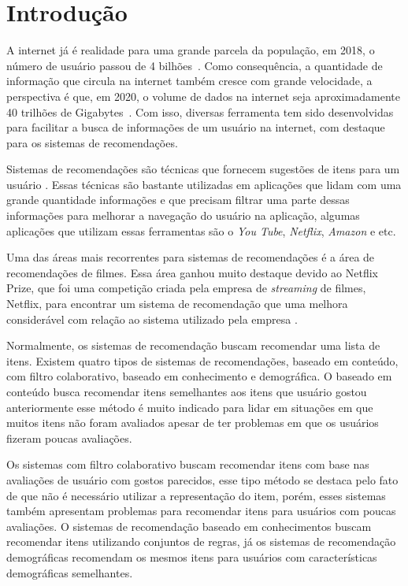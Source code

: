 \chapter{Introdução}
A internet já é realidade para uma grande parcela da população, em 2018, o número de usuário passou de 4 bilhões~\cite{internetusers}. Como consequência, a quantidade de informação que circula na internet também cresce com grande velocidade, a perspectiva é que, em 2020, o volume de dados na internet seja aproximadamente 40 trilhões de Gigabytes~\cite{volumedados}. Com isso, diversas ferramenta tem sido desenvolvidas para facilitar a busca de informações de um usuário na internet, com destaque para os sistemas de recomendações.

Sistemas de recomendações são técnicas que fornecem sugestões de itens para um usuário \cite{ricci2011introduction}. Essas técnicas são bastante utilizadas em aplicações que lidam com uma grande quantidade informações e que precisam filtrar uma parte dessas informações para melhorar a navegação do usuário na aplicação, algumas aplicações que utilizam essas ferramentas são o \textit{You Tube}, \textit{Netflix}, \textit{Amazon} e etc.

Uma das áreas mais recorrentes para sistemas de recomendações é a área de recomendações de filmes. Essa área ganhou muito destaque devido ao Netflix Prize, que foi uma competição criada pela empresa de \textit{streaming} de filmes, Netflix, para encontrar um sistema de recomendação que uma melhora considerável com relação ao sistema utilizado pela empresa \cite{netflixprize}.

Normalmente, os sistemas de recomendação buscam recomendar uma lista de itens. Existem quatro tipos de sistemas de recomendações, baseado em conteúdo, com filtro colaborativo, baseado em conhecimento e demográfica. O baseado em conteúdo busca recomendar itens semelhantes aos itens que usuário gostou anteriormente esse método é muito indicado para lidar em situações em que muitos itens não foram avaliados apesar de ter problemas em que os usuários fizeram poucas avaliações.

Os sistemas com filtro colaborativo buscam recomendar itens com base nas avaliações de usuário com gostos parecidos, esse tipo método se destaca pelo fato de que não é necessário utilizar a representação do item, porém, esses sistemas também apresentam problemas para recomendar itens para usuários com poucas avaliações. O sistemas de recomendação baseado em conhecimentos buscam recomendar itens utilizando conjuntos de regras, já os sistemas de recomendação demográficas recomendam os mesmos itens para usuários com características demográficas semelhantes.


